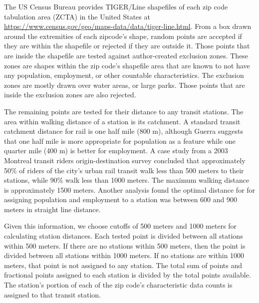 \documentclass[11pt]{article}
\begin{document}
The US Census Bureau provides TIGER/Line shapefiles of each zip code tabulation area (ZCTA) in the United States at \url{https://www.census.gov/geo/maps-data/data/tiger-line.html}.  From a box drawn around the extremities of each zipcode's shape, random points are accepted if they are within the shapefile or rejected if they are outside it. Those points that are inside the shapefile are tested against author-created exclusion zones. These zones are shapes within the zip code's shapefile area that are known to not have any population, employment, or other countable characteristics. The exclusion zones are mostly drawn over water areas, or large parks. Those points that are inside the exclusion zones are also rejected.

The remaining points are tested for their distance to any transit stations. The area within walking distance of a station is its catchment. A standard transit catchment distance for rail is one half mile (800 m), although Guerra \cite{Guerra2012} suggests that one half mile is more appropriate for population as a feature while one quarter mile (400 m) is better for employment. A case study \cite{ElGeneidy2014} from a 2003 Montreal transit riders origin-destination survey concluded that approximately 50\% of riders of the city's urban rail transit walk less than 500 meters to their stations, while 90\% walk less than 1000 meters. The maximum walking distance is approximately 1500 meters. Another analysis \cite{Gutierrez2011} found the optimal distance for  for assigning population and employment to a station was between 600 and 900 meters in straight line distance.

Given this information, we choose cutoffs of 500 meters and 1000 meters for calculating station distances. Each tested point is divided between all stations within 500 meters. If there are no stations within 500 meters, then the point is divided between all stations within 1000 meters. If no stations are within 1000 meters, that point is not assigned to any station. The total sum of points and fractional points assigned to each station is divided by the total points available. The station's portion of each of the zip code's characteristic data counts is assigned to that transit station. 
\end{document}
